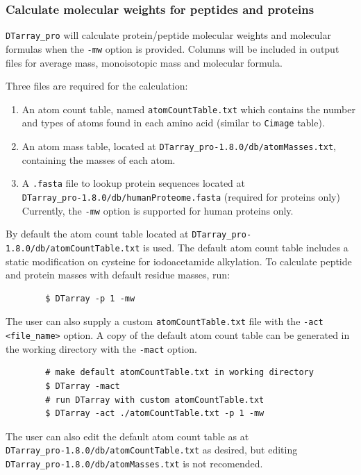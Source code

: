 \documentclass[12pt]{article}
\newcommand{\VERSION}{1.8.0}
\begin{document}
	\subsubsection{Calculate molecular weights for peptides and proteins}
	
	\texttt{DTarray\_pro} will calculate protein/peptide molecular weights and  molecular  formulas when the \texttt{-mw} option is provided. Columns  will  be  included in output files for average mass, monoisotopic mass and molecular formula.  
	
	\bigskip
	\noindent
	Three files are required for the calculation:
	
	\begin{enumerate}
		\item  An atom count table, named \texttt{atomCountTable.txt} which contains the number and types of atoms found in each amino acid (similar to \texttt{Cimage} table).
		
		\item An atom mass table, located at \texttt{DTarray\_pro-\VERSION/db/atomMasses.txt}, containing the masses of each atom.  
		
		\item A \texttt{.fasta} file to lookup protein sequences located at \\ \texttt{DTarray\_pro-\VERSION/db/humanProteome.fasta} (required for proteins only) Currently, the \texttt{-mw} option is supported for human proteins only.
	\end{enumerate}
	
	\noindent
	By default the atom count table located at \texttt{DTarray\_pro-\VERSION/db/atomCountTable.txt} is used. The default atom count table includes a static modification on cysteine for iodoacetamide alkylation.  To calculate peptide and protein masses with default residue masses, run:
	
	\begin{lstlisting}
		$ DTarray -p 1 -mw
	\end{lstlisting}
	
	\noindent
	The  user  can  also supply a custom \texttt{atomCountTable.txt} file with the \texttt{-act <file\_name>} option. A copy of the default atom count table can be generated in the working directory with the \texttt{-mact} option.  
	
	\begin{lstlisting}
		# make default atomCountTable.txt in working directory
		$ DTarray -mact
		# run DTarray with custom atomCountTable.txt
		$ DTarray -act ./atomCountTable.txt -p 1 -mw
	\end{lstlisting}
	
	\noindent
	The user can also edit the default atom count table as at \\ \texttt{DTarray\_pro-\VERSION/db/atomCountTable.txt} as desired, but editing \\ \texttt{DTarray\_pro-\VERSION/db/atomMasses.txt} is not recomended.
	
\end{document}
